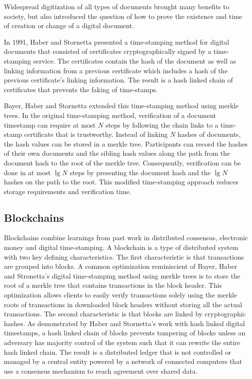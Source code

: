 Widespread digitization of all types of documents brought many benefits to
society, but also introduced the question of how to prove the existence and time of creation or change of a
digital document.

In 1991, Haber and Stornetta presented a time-stamping method for digital
documents that consisted of certificates cryptographically signed by a time-stamping service. The
certificates contain the hash of the document as well as linking information from a
previous certificate which includes a hash of the previous certificate's linking
information\cite{haber1991}. The result is a hash linked chain of certificates
that prevents the faking of time-stamps.

Bayer, Haber and Stornetta extended this time-stamping method using merkle
trees. In the original time-stamping method, verification of a document
timestamp can require at most $N$ steps by following the chain links to a
time-stamp certificate that is trustworthy\cite{bayer1993}. Instead of linking $N$
hashes of documents, the hash values can be stored in a merkle tree.
Participants can record the hashes of their own documents and the sibling hash
values along the path from the document hash to the root of the merkle tree.
Consequently, verification can be done in at most $\lg N$ steps by presenting the
document hash and the $\lg N$ hashes on the path to the root. This modified
time-stamping approach reduces storage requirements and verification time.

\subsection{Blockchains}
\label{sec:blockchains}

Blockchains combine learnings from past work in distributed consensus,
electronic money and digital time-stamping. A blockchain is a type of distributed system with two key defining
characteristics. The first characteristic is that transactions are grouped into blocks. A
common optimization reminiscient of Bayer, Haber and
Stronetta's digital time-stamping method using merkle trees is to store the root of a merkle tree that contains
transactions in the block header. This optimization allows clients to easily
verify transactions solely using the merkle roots of transactions in downloaded block headers without storing all
the actual transactions. The second characteristic is that blocks
are linked by cryptographic hashes. As demonstrated by Haber and Stornetta's
work with hash linked digital timestamps, a hash linked chain of blocks prevents
tampering of blocks unless an adversary has majority control of the system such
that it can rewrite the entire hash linked chain. The result is a distributed ledger that is not controlled or managed by a
central entity powered by a network of connected computers that use a consensus
mechanism to reach agreement over shared data\cite{whatisblockchain}.

